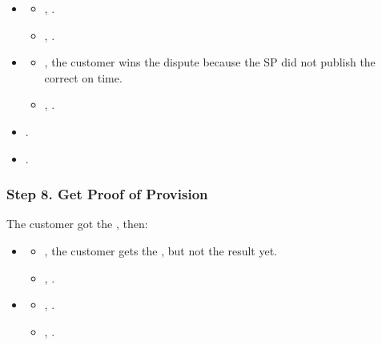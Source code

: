 \documentclass[pdftex,twocolumn,epjc3]{svjour3}
\begin{document}
{\ActedAbnormallyThen{\sp}

\begin{itemize}
\item \AgreeablePath
  \begin{itemize}
    \item {}, \CustomerPaidButDidntGetResult{}.
    \item {}, \SpReceivedThePayment{}.
  \end{itemize}
\item \DisputePath
  \begin{itemize}
    \item {}, the customer wins the dispute because the SP did not publish the correct \PoP{} on time.
    \item {}, .
  \end{itemize}
\end{itemize}

\Fairness

\begin{itemize}
  \item {}.
  \item {}.
\end{itemize}


\subsubsection*{Step 8. \CustomerTurn{} Get Proof of Provision}\label{step-8-pull-proof-of-provision}

The customer got the \PoP{}, then:

\begin{itemize}
\item \AgreeablePath
  \begin{itemize}
    \item {}, the customer gets the \cid{}, but not the result yet.
    \item {}, .
  \end{itemize}
\item \DisputePath

  \begin{itemize}
    \item {}, \CustomerLosesBecauseSPCanProveBeingCorrect{}.
    \item {}, .
  \end{itemize}
\end{itemize}

}
\end{document}
